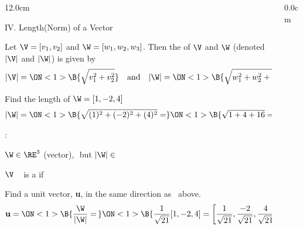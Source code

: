 \begin{frame}
\begin{columns}
\begin{column}{12.0cm}

{IV. Length(Norm) of a Vector}

\vspace{0.2cm}

\scriptsize

\DEF Let $\V = [v_1,v_2]$ and $\W = [w_1,w_2,w_3]$.  Then the  of $\V$ and $\W$ (denoted $|\V|$ and $|\W|$) is given by
\begin{align*}
	|\V| = \ON<1>{\B{\sqrt{v_1^2 + v_2^2}}} \quad \text{and} \quad |\W| = \ON<1>{\B{\sqrt{w_1^2 + w_2^2 + w_3^2}}}
\end{align*}

\EX Find the length of $\W = [1,-2,4]$
\begin{align*}
	|\W| = \ON<1>{\B{\sqrt{(1)^2 + (-2)^2 + (4)^2} =}} \ON<1>{\B{\sqrt{1+4+16} = \sqrt{21}}}
\end{align*}

:

\vspace{0.1cm}

\OBUL $\W \in \RE^3$ (vector),\,\, but $|\W| \in $ \\

\vspace{0.4cm}

\DEF $\V$ \,\,\, is a  if \,\,\, 

\vspace{0.4cm}

\EX Find a unit vector, {\bf u}, in the same direction as \W \, above.
\begin{align*}
	{\bf u} = \ON<1>{\B{\frac{\W}{|\W|} =\,}} \ON<1>{\B{\frac{1}{\sqrt{21}}[1,-2,4] = \left[\frac{1}{\sqrt{21}},\frac{-2}{\sqrt{21}},\frac{4}{\sqrt{21}}\right]}} \\
\end{align*}

\end{column}
\begin{column}{0.0cm}\end{column}
\end{columns}
\end{frame}

